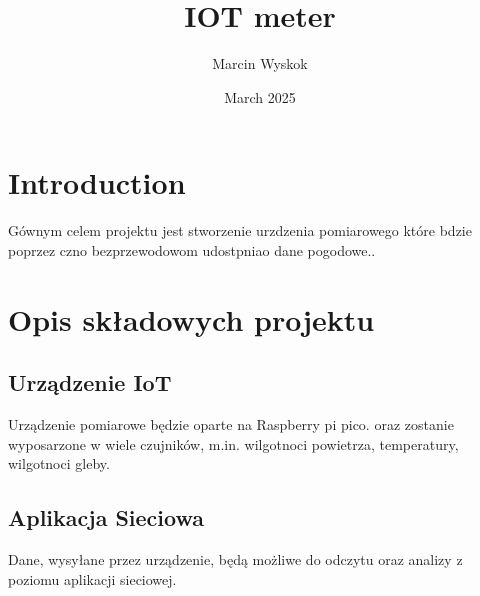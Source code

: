 \documentclass{article}
\title{IOT meter}
\author{Marcin Wyskok}
\date{March 2025}
\begin{document}
\maketitle

\section{Introduction}
    Gównym celem projektu jest stworzenie urzdzenia pomiarowego które bdzie poprzez czno bezprzewodowom udostpniao dane pogodowe..

\section{Opis składowych projektu}
\subsection{Urządzenie IoT}
    Urządzenie pomiarowe będzie oparte na Raspberry pi pico. oraz zostanie wyposarzone w wiele czujników, m.in. wilgotnoci powietrza, temperatury, wilgotnoci gleby.
\subsection{Aplikacja Sieciowa}
    Dane, wysyłane przez urządzenie, będą możliwe do odczytu oraz analizy z poziomu aplikacji sieciowej.
\end{document}

